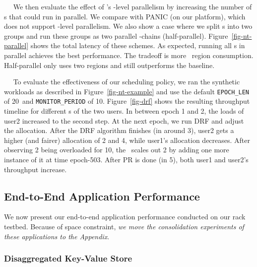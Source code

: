 
%


~~
We then evaluate the effect of \snic's \nt-level parallelism by increasing the number of \nt{}s that could run in parallel.
We compare with PANIC (on our platform), which does not support \nt-level parallelism.
We also show a case where we split \nt{}s into two groups and run these groups as two parallel \nt-chains (half-parallel).
Figure~\ref{fig-nt-parallel} shows the total latency of these schemes.
As expected, running all \nt{}s in parallel achieves the best performance.
The tradeoff is more \nt\ region consumption.
Half-parallel only uses two regions and still outperforms the baseline. %

~~
To evaluate the effectiveness of our scheduling policy, we ran the synthetic workloads as described in Figure~\ref{fig-nt-example} and use the default \texttt{EPOCH\_LEN} of 20\mus\ and \texttt{MONITOR\_PERIOD} of 10\ms.
Figure~\ref{fig-drf} shows the resulting throughput timeline for different \nt{}s of the two users.
In between epoch 1 and 2, the loads of user2 increased to the second step.
At the next epoch, we run DRF and adjust the allocation. After the DRF algorithm finishes (in around 3\mus), user2 gets a higher (and fairer) allocation of \nt{}2 and \nt{}4, while user1's allocation decreases.
After observing \nt{}2 being overloaded for 10\ms, the \snic\ scales out \nt{}2 by adding one more instance of it at time epoch-503.
After PR is done (in 5\ms), both user1 and user2's throughput increase.



\subsection{End-to-End Application Performance}

We now present our end-to-end application performance conducted on our rack testbed. Because of space constraint, \textit{we move the consolidation experiments of these applications to the Appendix}.

\subsubsection{Disaggregated Key-Value Store}

